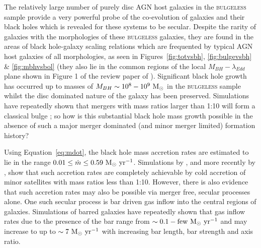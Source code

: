 {The relatively large number of purely disc AGN host galaxies in the \textsc{bulgeless} sample provide a very powerful probe of the co-evolution of galaxies and their black holes which is revealed for these systems to be secular. Despite the rarity of galaxies with the morphologies of these \textsc{bulgeless} galaxies, they are found in the areas of black hole-galaxy scaling relations which are frequented by typical AGN host galaxies of all morphologies, as seen in Figures~\ref{fig:totvsbh}, \ref{fig:bulgevsbh} \& \ref{fig:mbhvsbol} (they also lie in the common regions of the local $M_{BH}-\lambda_{Edd}$ plane shown in Figure 1 of the review paper of \citealt{alexander12}). Significant black hole growth has occurred up to masses of $M_{BH}\sim10^8 - 10^9~\rm{M}_{\odot}$ in the \textsc{bulgeless} sample whilst the disc dominated nature of the galaxy has been preserved. Simulations have repeatedly shown that mergers with mass ratios larger than 1:10 will form a classical bulge \citep{walker96, hopkins11c, tonini16}; so how is this substantial black hole mass growth possible in the absence of such a major merger dominated (and minor merger limited) formation history?

Using Equation~\ref{eq:mdot}, the black hole mass accretion rates are estimated to lie in the range $0.01 \leq \dot{m} \leq 0.59 ~\rm{M}_{\odot}~\rm{yr}^{-1}$. Simulations by \citet{crockett11}, and more recently by \citet{diteodoro14}, show that such accretion rates are completely achievable by cold accretion of minor satellites with mass ratios less than 1:10. However, there is also evidence that such accretion rates may also be possible via merger free, secular processes alone. One such secular process is bar driven gas inflow into the central regions of galaxies. Simulations of barred galaxies have repeatedly shown that gas inflow rates due to the presence of the bar range from $\sim0.1-\rm{few} ~\rm{M}_{\odot}~\rm{yr}^{-1}$ \citep{sakamoto96, maciejewski02, regan04, lin13} and may increase to up to $\sim 7 ~\rm{M}_{\odot}~\rm{yr}^{-1}$ \citep{friedli93} with increasing bar length, bar strength and axis ratio. 

}
